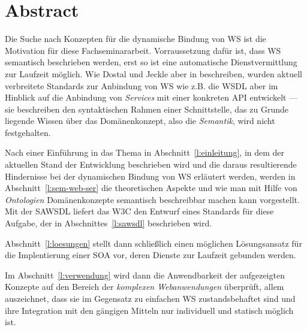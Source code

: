 \section*{Abstract}

Die Suche nach Konzepten für die dynamische Bindung von \acl{WS} ist die Motivation für diese Fachseminararbeit. Vorraussetzung dafür ist, dass \acl{WS} semantisch beschrieben werden, erst so ist eine automatische Dienstvermittlung zur Laufzeit möglich. Wie Dostal und Jeckle aber in \cite[S.55]{xmlspek1} beschreiben, wurden aktuell verbreitete Standards zur Anbindung von \acl{WS} wie z.B. die \acs{WSDL} aber im Hinblick auf die Anbindung von \emph{Services} mit einer konkreten \acs{API} entwickelt --- sie beschreiben den syntaktischen Rahmen einer Schnittstelle, das zu Grunde liegende Wissen über das Domänenkonzept, also die \emph{Semantik}, wird nicht festgehalten. 

Nach einer Einführung in das Thema in Abschnitt~\ref{l:einleitung}, in dem der aktuellen Stand der Entwicklung beschrieben wird und die daraus resultierende Hindernisse bei der dynamischen Bindung von \acl{WS} erläutert werden, werden in Abschnitt~\ref{l:sem-web-ser} die theoretischen Aspekte und wie man mit Hilfe von \emph{Ontologien} Domänenkonzepte semantisch beschreibbar machen kann vorgestellt. Mit der \acs{SAWSDL} liefert das \acs{W3C} den Entwurf eines Standards für diese Aufgabe, der in Abschnittes~\ref{l:sawsdl} beschrieben wird.

Abschnitt~\ref{l:loesungen} stellt dann schließlich einen möglichen Lösungsansatz für die Implentierung einer \acs{SOA} vor, deren Dienste zur Laufzeit gebunden werden.

Im Abschnitt~\ref{l:verwendung} wird dann die Anwendbarkeit der aufgezeigten Konzepte auf den Bereich der \emph{komplexen Webanwendungen} überprüft, allem auszeichnet, dass sie im Gegensatz zu einfachen \acl{WS} zustandsbehaftet sind und ihre Integration mit den gängigen Mitteln nur individuell und statisch möglich ist.